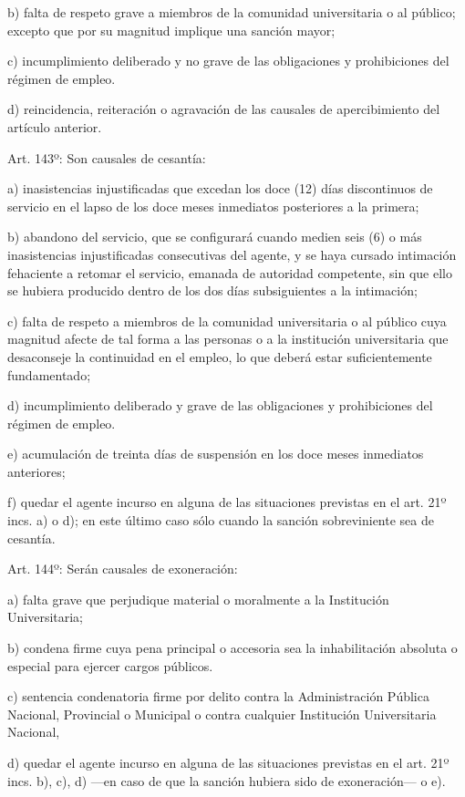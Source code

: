 \documentclass[]{article}
\begin{document}
b) falta de respeto grave a miembros de la comunidad universitaria o al
público; excepto que por su magnitud implique una sanción mayor;

c) incumplimiento deliberado y no grave de las obligaciones y
prohibiciones del régimen de empleo.

d) reincidencia, reiteración o agravación de las causales de
apercibimiento del artículo anterior.

Art. 143º: Son causales de cesantía:

a) inasistencias injustificadas que excedan los doce (12) días
discontinuos de servicio en el lapso de los doce meses inmediatos
posteriores a la primera;

b) abandono del servicio, que se configurará cuando medien seis (6) o
más inasistencias injustificadas consecutivas del agente, y se haya
cursado intimación fehaciente a retomar el servicio, emanada de
autoridad competente, sin que ello se hubiera producido dentro de los
dos días subsiguientes a la intimación;

c) falta de respeto a miembros de la comunidad universitaria o al
público cuya magnitud afecte de tal forma a las personas o a la
institución universitaria que desaconseje la continuidad en el empleo,
lo que deberá estar suficientemente fundamentado;

d) incumplimiento deliberado y grave de las obligaciones y prohibiciones
del régimen de empleo.

e) acumulación de treinta días de suspensión en los doce meses
inmediatos anteriores;

f) quedar el agente incurso en alguna de las situaciones previstas en el
art. 21º incs. a) o d); en este último caso sólo cuando la sanción
sobreviniente sea de cesantía.

Art. 144º: Serán causales de exoneración:

a) falta grave que perjudique material o moralmente a la Institución
Universitaria;

b) condena firme cuya pena principal o accesoria sea la inhabilitación
absoluta o especial para ejercer cargos públicos.

c) sentencia condenatoria firme por delito contra la Administración
Pública Nacional, Provincial o Municipal o contra cualquier Institución
Universitaria Nacional,

d) quedar el agente incurso en alguna de las situaciones previstas en el
art. 21º incs. b), c), d) ---en caso de que la sanción hubiera sido de
exoneración--- o e).
\end{document}
